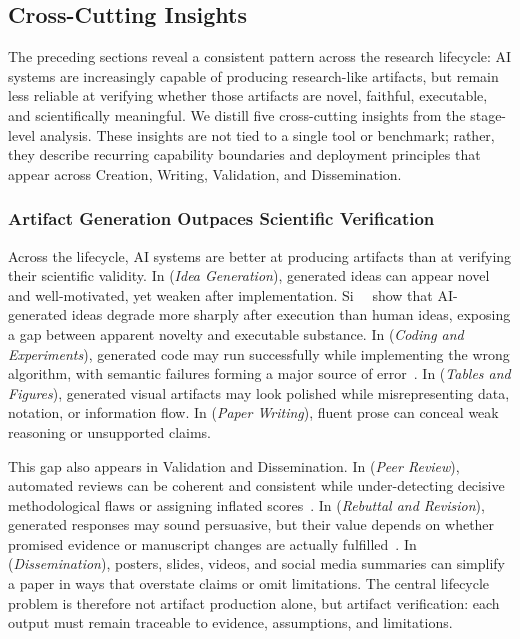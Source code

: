 \subsection{Cross-Cutting Insights}
\label{sec:insights}

The preceding sections reveal a consistent pattern across the research lifecycle: AI systems are increasingly capable of producing research-like artifacts, but remain less reliable at verifying whether those artifacts are novel, faithful, executable, and scientifically meaningful. We distill five cross-cutting insights from the stage-level analysis. These insights are not tied to a single tool or benchmark; rather, they describe recurring capability boundaries and deployment principles that appear across Creation, Writing, Validation, and Dissemination.


\subsubsection{Artifact Generation Outpaces Scientific Verification}
\label{sec:insight_generation_verification}

Across the lifecycle, AI systems are better at producing artifacts than at verifying their scientific validity. In \Sone (\emph{Idea Generation}), generated ideas can appear novel and well-motivated, yet weaken after implementation. Si~\etal~\cite{si2025gap} show that AI-generated ideas degrade more sharply after execution than human ideas, exposing a gap between apparent novelty and executable substance. In \Sthree (\emph{Coding and Experiments}), generated code may run successfully while implementing the wrong algorithm, with semantic failures forming a major source of error~\cite{researchcodebench2025}. In \Sfour (\emph{Tables and Figures}), generated visual artifacts may look polished while misrepresenting data, notation, or information flow. In \Sfive (\emph{Paper Writing}), fluent prose can conceal weak reasoning or unsupported claims.

This gap also appears in Validation and Dissemination. In \Ssix (\emph{Peer Review}), automated reviews can be coherent and consistent while under-detecting decisive methodological flaws or assigning inflated scores~\cite{llmreviewer2025,claimcheck2025}. In \Sseven (\emph{Rebuttal and Revision}), generated responses may sound persuasive, but their value depends on whether promised evidence or manuscript changes are actually fulfilled~\cite{rebuttalcommitment2026}. In \Seight (\emph{Dissemination}), posters, slides, videos, and social media summaries can simplify a paper in ways that overstate claims or omit limitations. The central lifecycle problem is therefore not artifact production alone, but artifact verification: each output must remain traceable to evidence, assumptions, and limitations.


